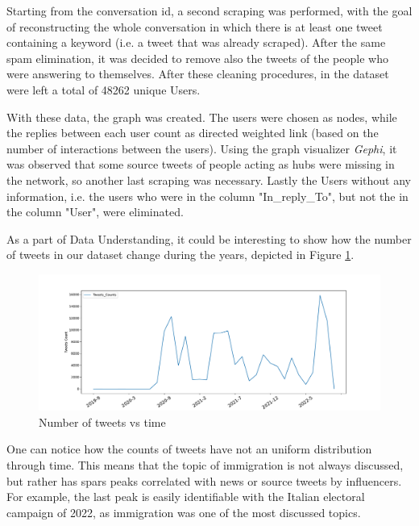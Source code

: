 \documentclass[sigchi]{acmart}
\begin{document}
Starting from the conversation id, a second scraping was performed, with the goal of reconstructing the whole conversation in which there is at least one tweet containing a keyword (i.e. a tweet that was already scraped). After the same spam elimination, it was decided to remove also the tweets of the people who were answering to themselves. 
After these cleaning procedures, in the dataset were left a total of 48262 unique Users. 

With these data, the graph was created. The users were chosen as nodes, while the replies between each user count as directed weighted link (based on the number of interactions between the users).
Using the graph visualizer \textit{Gephi}\cite{gephi}, it was observed that some source tweets of people acting as hubs were missing in the network, so another last scraping was necessary. 
Lastly the Users without any information, i.e. the users who were in the column "In\_reply\_To", but not the in the column "User", were eliminated. 

As a part of Data Understanding, it could be interesting to show how the number of tweets in our dataset change during the years, depicted in Figure \ref{fig:time}.

\begin{figure}[h]
    \centering
    \includegraphics[width=\columnwidth]{report/img/tweets_time.pdf}
    \caption{Number of tweets vs time}
    \label{fig:time}
\end{figure}

One can notice how the counts of tweets have not an uniform distribution through time. This means that the topic of immigration is not always discussed, but rather has spars peaks correlated with news or source tweets by influencers. For example, the last peak is easily identifiable with the Italian electoral campaign of 2022, as immigration was one of the most discussed topics.
\end{document}
